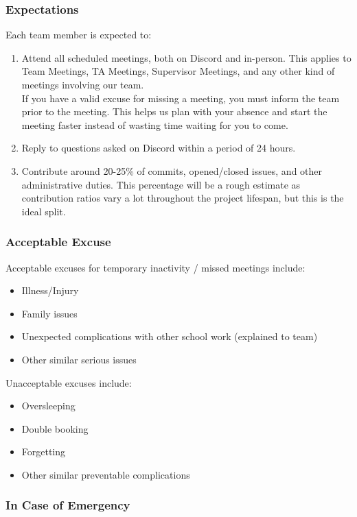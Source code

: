 \documentclass{article}
\begin{document}
\subsubsection*{Expectations}

Each team member is expected to:
\begin{enumerate}
\item{Attend all scheduled meetings, both on Discord and in-person. This applies to Team Meetings, TA Meetings, Supervisor Meetings, and any other kind of meetings involving our team.\\ If you have a valid excuse for missing a meeting, you must inform the team prior to the meeting. This helps us plan with your absence and start the meeting faster instead of wasting time waiting for you to come.}
\item{Reply to questions asked on Discord within a period of 24 hours.}
\item{Contribute around 20-25\% of commits, opened/closed issues, and other administrative duties. This percentage will be a rough estimate as contribution ratios vary a lot throughout the project lifespan, but this is the ideal split.}
\end{enumerate}

\subsubsection*{Acceptable Excuse}

Acceptable excuses for temporary inactivity / missed meetings include:
\begin{itemize}
\item{Illness/Injury}
\item{Family issues}
\item{Unexpected complications with other school work (explained to team)}
\item{Other similar serious issues}
\end{itemize}

Unacceptable excuses include:
\begin{itemize}
\item{Oversleeping}
\item{Double booking}
\item{Forgetting}
\item{Other similar preventable complications
}
\end{itemize}

\subsubsection*{In Case of Emergency}
\end{document}
